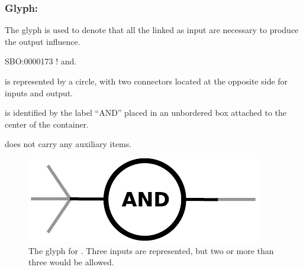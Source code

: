\color{blue}
\subsubsection{Glyph: }\label{sec:and}

The glyph  is used to denote that all the  linked as input are necessary to produce the output influence.

\begin{glyphDescription}

 \glyphSboTerm SBO:0000173 ! and.

 \glyphContainer {} is represented by a circle, with two connectors located at the opposite side for inputs and output.

  \glyphLabel {} is identified by the label ``AND'' placed in an unbordered box attached to the center of the container. 

  \glyphAux {} does not carry any auxiliary items.

\end{glyphDescription}


\begin{figure}[H]
  \centering
  \includegraphics[scale = 0.5]{images/and}
  \caption{The \ER glyph for . Three inputs are represented, but two or more than three would be allowed.}
  \label{fig:and}
\end{figure}


%
\normalcolor
